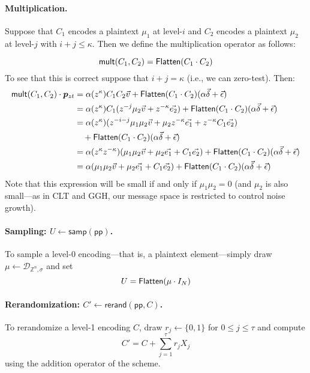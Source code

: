 \paragraph{Multiplication.}  Suppose that $C_1$ encodes a plaintext $\mu_1$ at level-$i$ and $C_2$ encodes a plaintext $\mu_2$ at level-$j$ with $i+j \leq \kappa$.  Then we define the multiplication operator as follows:

$$\mathsf{mult}(C_1, C_2) = \mathsf{Flatten}(C_1 \cdot C_2)$$
To see that this is correct suppose that $i+j = \kappa$ (i.e., we can zero-test).  Then:
\begin{align*}
\mathsf{mult}(C_1, C_2)\cdot \bm{p}_{zt} &= \alpha (z^\kappa) C_1C_2\vec{v} + \mathsf{Flatten}(C_1\cdot C_2)(\alpha\vec{\delta} + \vec{\epsilon})\\
&= \alpha (z^\kappa)C_1(z^{-j}\mu_2\vec{v} + z^{-\kappa}\vec{e_2}) + \mathsf{Flatten}(C_1\cdot C_2)(\alpha\vec{\delta} + \vec{\epsilon})\\
&= \alpha(z^\kappa)(z^{-i-j}\mu_1\mu_2 \vec{v} + \mu_2 z^{-\kappa}\vec{e_1} + z^{-\kappa}C_1\vec{e_2}) \\
&\quad + \mathsf{Flatten}(C_1\cdot C_2)(\alpha\vec{\delta} + \vec{\epsilon})\\
&= \alpha(z^\kappa z^{-\kappa}) (\mu_1\mu_2 \vec{v} + \mu_2 \vec{e_1} + C_1\vec{e_2}) + \mathsf{Flatten}(C_1\cdot C_2)(\alpha\vec{\delta} + \vec{\epsilon})\\
&= \alpha (\mu_1\mu_2 \vec{v} + \mu_2 \vec{e_1} + C_1\vec{e_2}) + \mathsf{Flatten}(C_1\cdot C_2)(\alpha\vec{\delta} + \vec{\epsilon})
\end{align*}
Note that this expression will be small if and only if $\mu_1\mu_2 = 0$ (and $\mu_2$ is also small---as in CLT and GGH, our message space is restricted to control noise growth).

\paragraph{Sampling:  $U \leftarrow \mathsf{samp}(\mathsf{pp})$.}  To sample a level-0 encoding---that is, a plaintext element---simply draw $\mu\leftarrow \mathcal{D}_{\mathbb{Z}^n, \sigma}$ and set $$U = \mathsf{Flatten}(\mu \cdot I_N)$$

\paragraph{Rerandomization: $C' \leftarrow \mathsf{rerand}(\mathsf{pp}, C)$.}  To rerandomize a level-1 encoding $C$, draw $r_j \leftarrow \{0,1\}$ for $0 \leq j \leq \tau$ and compute $$C' = C + \sum_{j=1}^\tau r_jX_j$$ using the addition operator of the scheme.

